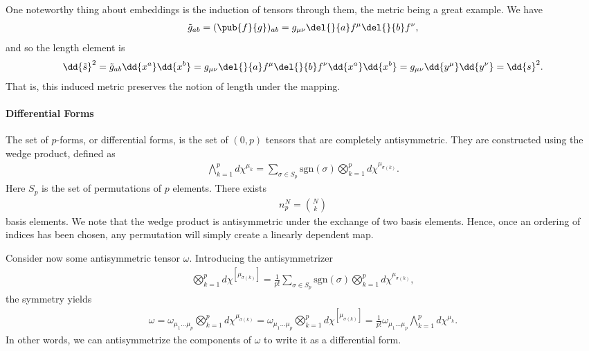 One noteworthy thing about embeddings is the induction of tensors through them, the metric being a great example. We have
\begin{align*}
	\tilde{g}_{ab} = (\pub{f}{g})_{ab} = g_{\mu\nu}\del{}{a}f^{\mu}\del{}{b}f^{\nu},
\end{align*}
and so the length element is
\begin{align*}
	\dd{\tilde{s}}^{2} = \tilde{g}_{ab}\dd{x^{a}}\dd{x^{b}} = g_{\mu\nu}\del{}{a}f^{\mu}\del{}{b}f^{\nu}\dd{x^{a}}\dd{x^{b}} = g_{\mu\nu}\dd{y^{\mu}}\dd{y^{\nu}} = \dd{s}^{2}.
\end{align*}
That is, this induced metric preserves the notion of length under the mapping.

\paragraph{Differential Forms}
The set of $p$-forms, or differential forms, is the set of $(0, p)$ tensors that are completely antisymmetric. They are constructed using the wedge product, defined as
\begin{align*}
	\bigwedge\limits_{k = 1}^{p}d\chi^{\mu_{k}} = \sum\limits_{\sigma\in S_{p}}\text{sgn}(\sigma)\bigotimes_{k = 1}^{p}d\chi^{\mu_{\sigma(k)}}.
\end{align*}
Here $S_{p}$ is the set of permutations of $p$ elements. There exists
\begin{align*}
	n_{p}^{N} = {N\choose k}
\end{align*}
basis elements. We note that the wedge product is antisymmetric under the exchange of two basis elements. Hence, once an ordering of indices has been chosen, any permutation will simply create a linearly dependent map.

Consider now some antisymmetric tensor $\omega$. Introducing the antisymmetrizer
\begin{align*}
	\bigotimes_{k = 1}^{p}d\chi^{[\mu_{\sigma(k)}]} = \frac{1}{p!}\sum\limits_{\sigma\in S_{p}}\text{sgn}(\sigma)\bigotimes_{k = 1}^{p}d\chi^{\mu_{\sigma(k)}},
\end{align*}
the symmetry yields
\begin{align*}
	\omega = \omega_{\mu_{1}\dots \mu_{p}}\bigotimes_{k = 1}^{p}d\chi^{\mu_{\sigma(k)}} = \omega_{\mu_{1}\dots \mu_{p}}\bigotimes_{k = 1}^{p}d\chi^{[\mu_{\sigma(k)}]} = \frac{1}{p!}\omega_{\mu_{1}\dots \mu_{p}}\bigwedge\limits_{k = 1}^{p}d\chi^{\mu_{k}}.
\end{align*}
In other words, we can antisymmetrize the components of $\omega$ to write it as a differential form.

